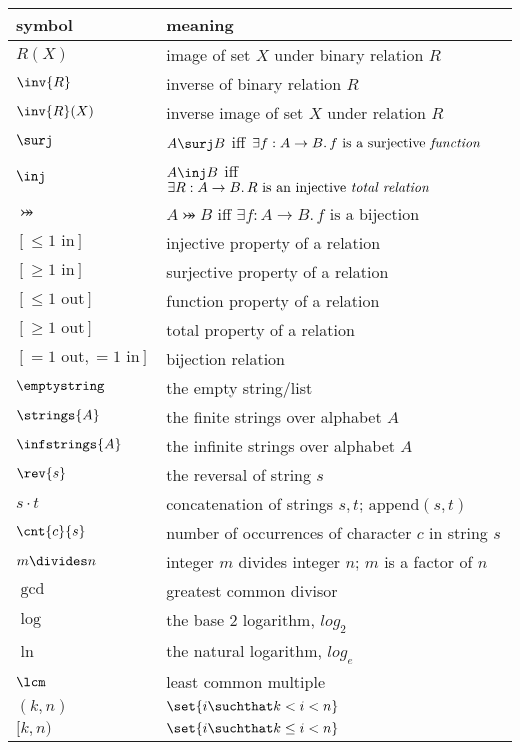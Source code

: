 \begin{center}
\begin{tabular}{ll}
symbol         &  meaning\\
\hline
$R(X)$         & image of set $X$ under binary relation $R$\\
$\inv{R}$      & inverse of binary relation $R$\\
$\inv{R}(X)$   & inverse image of set $X$ under relation $R$\\
$\surj$        & $A \surj B$ iff $\exists f:A \to B.\, f\text{ is a
  surjective \emph{function}}$\\
$\inj$         & $A \inj B$ iff $\exists R:A \to B.\, R\text{ is an
  injective \emph{total relation}}$\\
$\bij$         & $A \bij B$ iff $\exists f:A \to B.\, f\text{ is a
  bijection}$\\
$[\leq 1\text{ in}]$  & injective property of a relation\\
$[\geq 1\text{ in}]$  & surjective property of a relation\\
$[\leq 1\text{ out}]$  & function property of a relation\\
$[\geq 1\text{ out}]$  & total property of a relation\\
$[= 1\text{ out}, = 1\text{ in}]$  & bijection relation\\
$\emptystring$ & the empty string/list\\
$\strings{A}$  & the finite strings over alphabet $A$\\
$\infstrings{A}$ & the infinite strings over alphabet $A$\\
$\rev{s}$      & the reversal of string $s$\\
$s \cdot t$    & concatenation of strings $s,t$; $\text{append}(s,t)$\\
$\cnt{c}{s}$   & number of occurrences of character $c$ in string $s$\\
$m \divides n$ & integer $m$ divides integer $n$; $m$ is a factor of $n$\\
$\gcd$         & greatest common divisor\\
$\log$         & the base 2 logarithm, $log_2$\\
$\ln$          & the natural logarithm, $log_e$\\
$\lcm$         & least common multiple\\
$(k, n)$       & $\set{i \suchthat k < i < n}$\\
$[k, n)$       & $\set{i \suchthat k \le i < n}$\\

\end{tabular}
\end{center}
